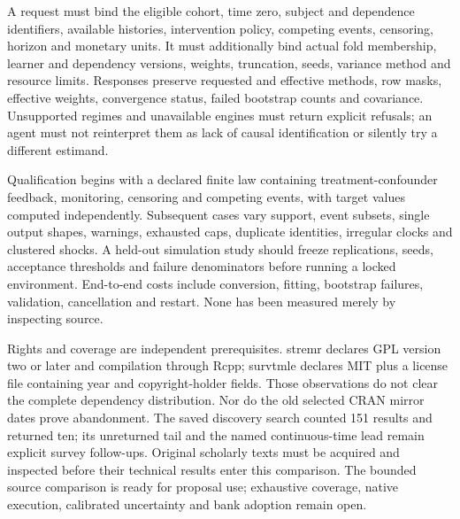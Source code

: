 A request must bind the eligible cohort, time zero, subject and dependence
identifiers, available histories, intervention policy, competing events,
censoring, horizon and monetary units. It must additionally bind actual fold
membership, learner and dependency versions, weights, truncation, seeds,
variance method and resource limits. Responses preserve requested and effective
methods, row masks, effective weights, convergence status, failed bootstrap
counts and covariance. Unsupported regimes and unavailable engines must return
explicit refusals; an agent must not reinterpret them as lack of causal
identification or silently try a different estimand.

Qualification begins with a declared finite law containing treatment-confounder
feedback, monitoring, censoring and competing events, with target values
computed independently. Subsequent cases vary support, event subsets, single
output shapes, warnings, exhausted caps, duplicate identities, irregular
clocks and clustered shocks. A held-out simulation study should freeze
replications, seeds, acceptance thresholds and failure denominators before
running a locked environment. End-to-end costs include conversion, fitting,
bootstrap failures, validation, cancellation and restart. None has been
measured merely by inspecting source.

Rights and coverage are independent prerequisites. stremr declares GPL version
two or later and compilation through Rcpp; survtmle declares MIT plus a license
file containing year and copyright-holder fields. Those observations do not
clear the complete dependency distribution. Nor do the old selected CRAN
mirror dates prove abandonment. The saved discovery search counted 151 results
and returned ten; its unreturned tail and the named continuous-time lead
remain explicit survey follow-ups. Original scholarly texts must be acquired
and inspected before their technical results enter this comparison.
The bounded source comparison is ready for proposal use; exhaustive coverage,
native execution, calibrated uncertainty and bank adoption remain open.
\citep{exec23_longr_stremr,exec23_longr_survtmle}
